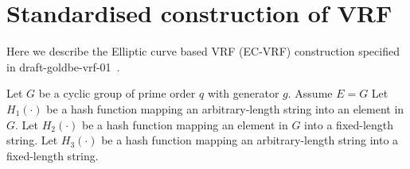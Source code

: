 \section{Standardised construction of VRF}

Here we describe the Elliptic curve based VRF (EC-VRF) construction specified in draft-goldbe-vrf-01~\cite{goldberg2017draft}.

Let $G$ be a cyclic group of prime order $q$ with generator $g$. Assume $E = G$
Let $H_1(\cdot)$ be a hash function mapping an arbitrary-length string into an element in $G$.
Let $H_2(\cdot)$ be a hash function mapping an element in $G$ into a fixed-length string.
Let $H_3(\cdot)$ be a hash function mapping an arbitrary-length string into a fixed-length string.

\noindent{}

